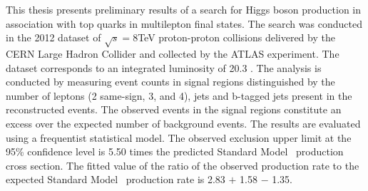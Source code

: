

This thesis presents preliminary results of a search for Higgs boson production
in association with top quarks in multilepton final states. The search
was conducted in the 2012 dataset of $\sqrt{s}=8$TeV proton-proton
collisions delivered by the CERN Large Hadron Collider and collected by
the ATLAS experiment. The dataset corresponds to an integrated luminosity of
20.3 \ifb. The analysis is conducted by measuring event counts in
signal regions distinguished by the number of leptons (2 same-sign, 
3, and 4), jets and b-tagged jets present in the reconstructed events. The observed
events in the signal regions constitute an excess over
the expected number of background events. The results
are evaluated using a frequentist statistical model. 
The observed exclusion upper limit at the 95\% confidence
level is 5.50 times the predicted Standard Model \tth\ production cross section. The fitted value of
the ratio of the observed production rate to the expected Standard Model
\tth\ production rate is 2.83 $+$ 1.58 $-$ 1.35. 


